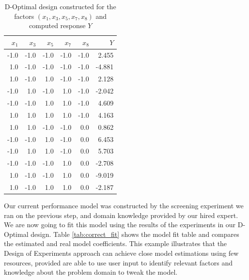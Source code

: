 \documentclass[conference]{IEEEtran}
\begin{document}
\begin{table}[ht]
\centering
\caption{D-Optimal design constructed for the factors $(x_1,x_3,x_5,x_7,x_8)$ and computed response $Y$}
\label{tab:d_optimal}
\begingroup\footnotesize
\begin{tabular}{rrrrrr}
  \toprule
$x_1$ & $x_3$ & $x_5$ & $x_7$ & $x_8$ & $Y$ \\
  \midrule
-1.0 & -1.0 & -1.0 & -1.0 & -1.0 & 2.455 \\
  1.0 & -1.0 & -1.0 & -1.0 & -1.0 & -4.881 \\
  1.0 & -1.0 & 1.0 & -1.0 & -1.0 & 2.128 \\
  -1.0 & 1.0 & -1.0 & 1.0 & -1.0 & -2.042 \\
  -1.0 & -1.0 & 1.0 & 1.0 & -1.0 & 4.609 \\
  1.0 & 1.0 & 1.0 & 1.0 & -1.0 & 4.163 \\
  1.0 & 1.0 & -1.0 & -1.0 & 0.0 & 0.862 \\
  -1.0 & -1.0 & 1.0 & -1.0 & 0.0 & 6.453 \\
  -1.0 & 1.0 & 1.0 & -1.0 & 0.0 & 5.703 \\
  -1.0 & -1.0 & -1.0 & 1.0 & 0.0 & -2.708 \\
  1.0 & -1.0 & -1.0 & 1.0 & 0.0 & -9.019 \\
  1.0 & -1.0 & 1.0 & 1.0 & 0.0 & -2.187 \\
   \bottomrule
\end{tabular}
\endgroup
\end{table}

Our current performance model was constructed by the screening experiment we ran
on the previous step, and domain knowledge provided by our hired expert. We are
now going to fit this model using the results of the experiments in our
D-Optimal design. Table \ref{tab:correct_fit} shows the model fit table and
compares the estimated and real model coefficients. This example illustrates
that the Design of Experiments approach can achieve close model estimations
using few resources, provided are able to use user input to identify relevant
factors and knowledge about the problem domain to tweak the model.
\end{document}
